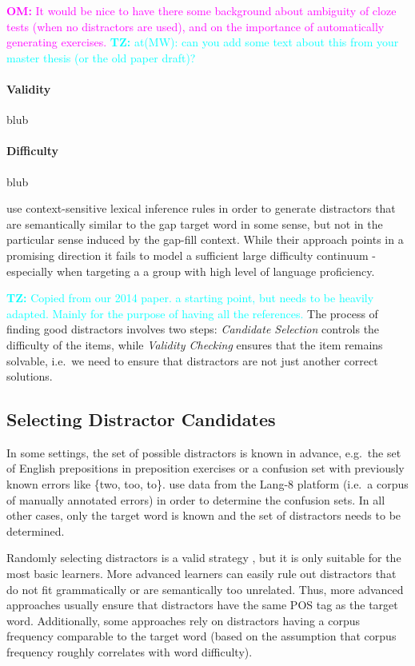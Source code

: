 \documentclass[11pt,letterpaper]{article}
\newcommand{\tz}[1]{\textcolor{cyan}{\textbf{TZ:} #1}}
\newcommand{\om}[1]{\textcolor{magenta}{\textbf{OM:} #1}}
\newcommand{\tz}[1]{}
\newcommand{\om}[1]{}
\begin{document}
\om{It would be nice  to have there some background about ambiguity of cloze tests (when no distractors are used), and on the importance of automatically generating exercises.}
\tz{at(MW): can you add some text about this from your master thesis (or the old paper draft)?}

\paragraph{Validity}
blub
\paragraph{Difficulty}
blub
\vspace{5mm}

 use context-sensitive lexical inference rules in order to generate distractors that are semantically similar to the gap target word in some sense, but not in the particular sense induced by the gap-fill context.
While their approach points in a promising direction it fails to model a sufficient large difficulty continuum - especially when targeting a a group with high level of language proficiency. 


\tz{Copied from our 2014 paper. a starting point, but needs to be heavily adapted. Mainly for the purpose of having all the references.}
The process of finding good distractors involves two steps: \emph{Candidate Selection} controls the difficulty of the items, while \emph{Validity Checking} ensures that the item remains solvable, i.e.\ we need to ensure that distractors are not just another correct solutions.

\subsection{Selecting Distractor Candidates}
In some settings, the set of possible distractors is known in advance, e.g.\ the set of English prepositions in preposition exercises \cite{Lee2007} or a confusion set with previously known errors like \{two, too, to\}.
 use data from the Lang-8 platform (i.e.\ a corpus of manually annotated errors) in order to determine the confusion sets.
In all other cases, only the target word is known and the set of distractors needs to be determined.

Randomly selecting distractors is a valid strategy \cite{Mostow2012}, but it is only suitable for the most basic learners.
More advanced learners can easily rule out distractors that do not fit grammatically or are semantically too unrelated.
Thus, more advanced approaches usually ensure that distractors have the same POS tag as the target word.
Additionally, some approaches \cite{Hoshino2007} rely on distractors having a corpus frequency comparable to the target word (based on the assumption that corpus frequency roughly correlates with word difficulty).
\end{document}
